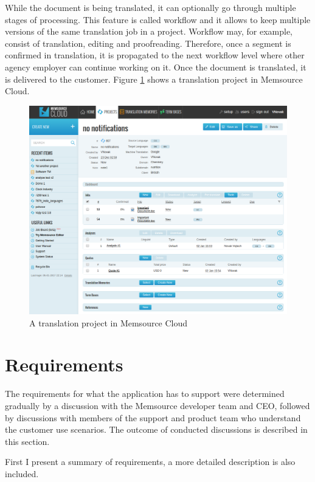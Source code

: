 While the document is being translated, it can optionally go through multiple stages of processing. This feature is called workflow and it allows to keep multiple versions of the same translation job in a project. Workflow may, for example, consist of translation, editing and proofreading. Therefore, once a segment is confirmed in translation, it is propagated to the next workflow level where other agency employer can continue working on it. Once the document is translated, it is delivered to the customer. Figure \ref{fig:cloud} shows a translation project in Memsource Cloud.

\begin{figure}[]
	\includegraphics[width=1\textwidth]{pics/cloud/project}
	\caption{A translation project in Memsource Cloud}
	\label{fig:cloud}
\end{figure}

\section{Requirements}
\label{sec:requirements}

The requirements for what the application has to support were determined gradually by a discussion with the Memsource developer team and CEO, followed by discussions with members of the support and product team who understand the customer use scenarios.
The outcome of conducted discussions is described in this section.

First I present a summary of requirements, a more detailed description is also included.

